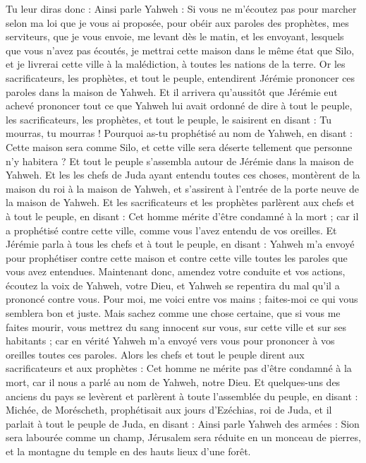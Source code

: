 \begin{multicols}{2}
Tu leur diras donc : Ainsi parle Yahweh : Si vous ne m'écoutez pas pour marcher selon ma loi que je vous ai proposée,
pour obéir aux paroles des prophètes, mes serviteurs, que je vous envoie, me levant dès le matin, et les envoyant, lesquels que vous n'avez pas écoutés,
je mettrai cette maison dans le même état que Silo, et je livrerai cette ville à la malédiction, à toutes les nations de la terre.
Or les sacrificateurs, les prophètes, et tout le peuple, entendirent Jérémie prononcer ces paroles dans la maison de Yahweh.
Et il arrivera qu'aussitôt que Jérémie eut achevé prononcer tout ce que Yahweh lui avait ordonné de dire à tout le peuple, les sacrificateurs, les prophètes, et tout le peuple, le saisirent en disant : Tu mourras, tu mourras !
Pourquoi as-tu prophétisé au nom de Yahweh, en disant : Cette maison sera comme Silo, et cette ville sera déserte tellement que personne n'y habitera ? Et tout le peuple s'assembla autour de Jérémie dans la maison de Yahweh.
Et les les chefs de Juda ayant entendu toutes ces choses, montèrent de la maison du roi à la maison de Yahweh, et s'assirent à l'entrée de la porte neuve de la maison de Yahweh.
Et les sacrificateurs et les prophètes parlèrent aux chefs et à tout le peuple, en disant : Cet homme mérite d'être condamné à la mort ; car il a prophétisé contre cette ville, comme vous l'avez entendu de vos oreilles.
Et Jérémie parla à tous les chefs et à tout le peuple, en disant : Yahweh m'a envoyé pour prophétiser contre cette maison et contre cette ville toutes les paroles que vous avez entendues.
Maintenant donc, amendez votre conduite et vos actions, écoutez la voix de Yahweh, votre Dieu, et Yahweh se repentira du mal qu'il a prononcé contre vous.
Pour moi, me voici entre vos mains ; faites-moi ce qui vous semblera bon et juste.
Mais sachez comme une chose certaine, que si vous me faites mourir, vous mettrez du sang innocent sur vous, sur cette ville et sur ses habitants ; car en vérité Yahweh m'a envoyé vers vous pour prononcer à vos oreilles toutes ces paroles.
Alors les chefs et tout le peuple dirent aux sacrificateurs et aux prophètes : Cet homme ne mérite pas d'être condamné à la mort, car il nous a parlé au nom de Yahweh, notre Dieu.
Et quelques-uns des anciens du pays se levèrent et parlèrent à toute l'assemblée du peuple, en disant :
Michée, de Moréscheth, prophétisait aux jours d'Ezéchias, roi de Juda, et il parlait à tout le peuple de Juda, en disant : Ainsi parle Yahweh des armées : Sion sera labourée comme un champ, Jérusalem sera réduite en un monceau de pierres, et la montagne du temple en des hauts lieux d'une forêt.

\end{multicols}
